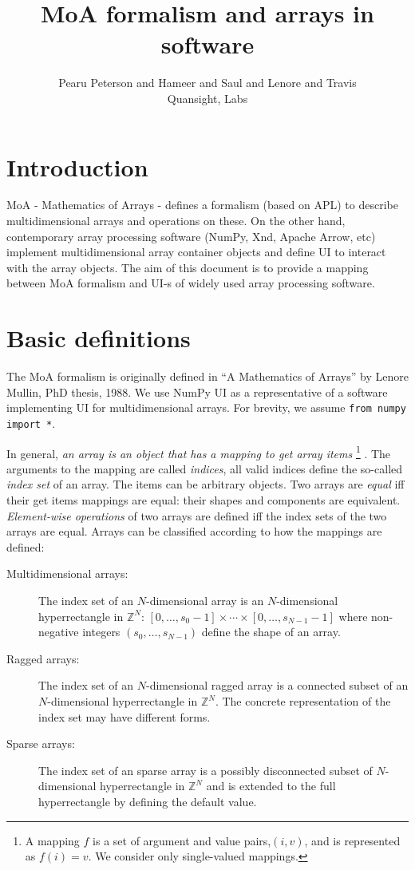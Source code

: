 \documentclass[a4paper,12pt]{article}
\title{MoA formalism and arrays in software}
\author{Pearu Peterson and Hameer and Saul and Lenore and Travis\\
Quansight, Labs}
\newcommand{\Z}{{\mathbb{Z}}}                     %
\begin{document}
\maketitle
\section{Introduction}

MoA - Mathematics of Arrays - defines a formalism (based on APL) to
describe multidimensional arrays and operations on these. On the other
hand, contemporary array processing software (NumPy, Xnd, Apache
Arrow, etc) implement multidimensional array container objects and
define UI to interact with the array objects. The aim of this document
is to provide a mapping between MoA formalism and UI-s of widely used
array processing software.

\section{Basic definitions}

The MoA formalism is originally defined in ``A Mathematics of Arrays''
by Lenore Mullin, PhD thesis, 1988\cite{mul00}.  We use NumPy UI as a
representative of a software implementing UI for multidimensional
arrays. For brevity, we assume \verb+from numpy import *+.

\noindent
In general, \emph{an array is an object that has a mapping to get
  array items} \footnote{A mapping $f$ is a set of argument and value
  pairs,$(i,v)$, and is represented as $f(i)=v$. We consider only
  single-valued mappings.} . The arguments to the mapping are called
\emph{indices}, all valid indices define the so-called \emph{index
  set} of an array. The items can be arbitrary objects.
Two arrays are \emph{equal} iff their get items mappings are equal: their shapes and components are equivalent.
\emph{Element-wise operations} of two arrays are defined iff the index
sets of the two arrays are equal.
Arrays can be classified according to how the mappings are defined:
\begin{description}
\item[Multidimensional arrays:] The index set of
  an $N$-dimensional array is an $N$-dimensional hyperrectangle in
  $\Z^N$: $[0,\ldots,s_0-1]\times\cdots\times[0,\ldots,s_{N-1}-1]$
  where non-negative integers $(s_0,\ldots,s_{N-1})$ define the shape
  of an array.
\item[Ragged arrays:] The index set of an
  $N$-dimensional ragged array is a connected subset of an
  $N$-dimensional hyperrectangle in $\Z^N$. The concrete
  representation of the index set may have different forms.
\item[Sparse arrays:] The index set of an sparse array is a possibly
  disconnected subset of $N$-dimensional hyperrectangle in $\Z^N$ and
  is extended to the full hyperrectangle by defining the default
  value.
\end{description}
\end{document}
